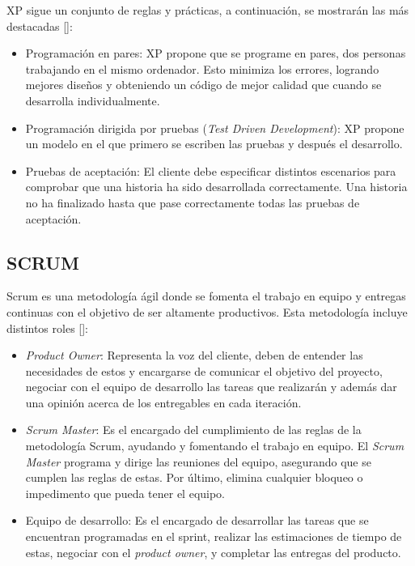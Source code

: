 XP sigue un conjunto de reglas y prácticas, a continuación, se mostrarán las más 
destacadas [\cite{92}]:
\begin{itemize}
\item Programación en pares: XP propone que se programe en pares, dos personas trabajando en el mismo ordenador. Esto minimiza los errores, logrando mejores diseños y obteniendo un código de mejor calidad que cuando se desarrolla individualmente.
\item Programación dirigida por pruebas (\textit{Test Driven Development}): XP propone un modelo en el que primero se escriben las pruebas y después el desarrollo.
\item Pruebas de aceptación: El cliente debe especificar distintos escenarios para comprobar que una historia ha sido desarrollada correctamente. Una historia no ha finalizado hasta que pase correctamente todas las pruebas de aceptación.
\end{itemize}

\subsection{SCRUM}
Scrum es una metodología ágil donde se fomenta el trabajo en equipo y entregas continuas con el objetivo de ser altamente productivos. Esta metodología incluye distintos roles [\cite{92}]:
\begin{itemize}
\item \textit{Product Owner}: Representa la voz del cliente, deben de entender las necesidades de estos y encargarse de comunicar el objetivo del proyecto, negociar con el equipo de desarrollo las tareas que realizarán y además dar una opinión acerca de los entregables en cada iteración.
\item \textit{Scrum Master}: Es el encargado del cumplimiento de las reglas de la metodología Scrum, ayudando y fomentando el trabajo en equipo. El \textit{Scrum Master} programa y dirige las reuniones del equipo, asegurando que se cumplen las reglas de estas. Por último, elimina cualquier bloqueo o impedimento que pueda tener el equipo.
\item Equipo de desarrollo: Es el encargado de desarrollar las tareas que se encuentran programadas en el sprint, realizar las estimaciones de tiempo de estas, negociar con el \textit{product owner}, y completar las entregas del producto.
\end{itemize}


